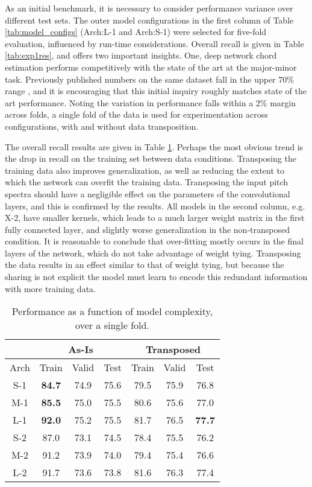 As an initial benchmark, it is necessary to consider performance variance over different test sets.
The outer model configurations in the first column of Table \ref{tab:model_configs} (Arch:L-1 and Arch:S-1) were selected for five-fold evaluation, influenced by run-time considerations.
Overall recall is given in Table \ref{tab:exp1res}, and offers two important insights.
One, deep network chord estimation performs competitively with the state of the art at the major-minor task.
Previously published numbers on the same dataset fall in the upper 70\% range \cite{Cho2010Exploring}, and it is encouraging that this initial inquiry roughly matches state of the art performance.
Noting the variation in performance falls within a 2\% margin across folds, a single fold of the data is used for experimentation across configurations, with and without data transposition.

The overall recall results are given in Table \ref{tab:exp2res}.
Perhaps the most obvious trend is the drop in recall on the training set between data conditions.
Transposing the training data also improves generalization, as well as reducing the extent to which the network can overfit the training data.
Transposing the input pitch spectra should have a negligible effect on the parameters of the convolutional layers, and this is confirmed by the results.
All models in the second column, e.g. X-2, have smaller kernels, which leads to a much larger weight matrix in the first fully connected layer, and slightly worse generalization in the non-transposed condition.
It is reasonable to conclude that over-fitting mostly occurs in the final layers of the network, which do not take advantage of weight tying.
Transposing the data results in an effect similar to that of weight tying, but because the sharing is not explicit the model must learn to encode this redundant information with more training data.


\begin{table}[!t]
\caption{Performance as a function of model complexity, over a single fold.}
\label{tab:exp2res}
\centering
\begin{tabular}{ c || c c c || c c c |}
& \multicolumn{3}{c||}{As-Is} & \multicolumn{3}{|c|}{Transposed}\\
 \hline
Arch & Train & Valid & Test & Train & Valid & Test \\
\hline
S-1 & \textbf{84.7} & 74.9 & 75.6 & 79.5 & 75.9 & 76.8 \\
M-1 & \textbf{85.5} & 75.0 & 75.5 & 80.6 & 75.6 & 77.0 \\
L-1 & \textbf{92.0} & 75.2 & 75.5 & 81.7 & 76.5 & \textbf{77.7} \\
\hline
S-2 & 87.0 & 73.1 & 74.5 & 78.4 & 75.5 & 76.2 \\
M-2 & 91.2 & 73.9 & 74.0 & 79.4 & 75.4 & 76.6 \\
L-2 & 91.7 & 73.6 & 73.8 & 81.6 & 76.3 & 77.4 \\
\hline
\end{tabular}
\end{table}


